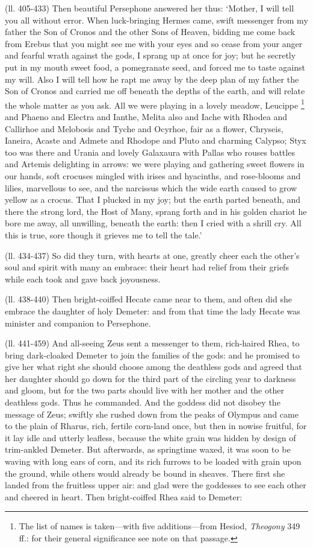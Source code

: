 (ll. 405-433) Then beautiful Persephone answered her thus: ‘Mother, I
will tell you all without error. When luck-bringing Hermes came, swift
messenger from my father the Son of Cronos and the other Sons of Heaven,
bidding me come back from Erebus that you might see me with your eyes and so
cease from your anger and fearful wrath against the gods, I sprang up at once
for joy; but he secretly put in my mouth sweet food, a pomegranate seed, and
forced me to taste against my will. Also I will tell how he rapt me away by the
deep plan of my father the Son of Cronos and carried me off beneath the depths
of the earth, and will relate the whole matter as you ask. All we were playing
in a lovely meadow, Leucippe \footnote{The list of names is
taken—with five additions—from Hesiod, \emph{Theogony} 349
ff.: for their general significance see note on that passage.} and Phaeno and Electra and
Ianthe, Melita also and Iache with Rhodea and Callirhoe and Melobosis and Tyche
and Ocyrhoe, fair as a flower, Chryseis, Ianeira, Acaste and Admete and Rhodope
and Pluto and charming Calypso; Styx too was there and Urania and lovely
Galaxaura with Pallas who rouses battles and Artemis delighting in arrows: we
were playing and gathering sweet flowers in our hands, soft crocuses mingled
with irises and hyacinths, and rose-blooms and lilies, marvellous to see, and
the narcissus which the wide earth caused to grow yellow as a crocus. That I
plucked in my joy; but the earth parted beneath, and there the strong lord, the
Host of Many, sprang forth and in his golden chariot he bore me away, all
unwilling, beneath the earth: then I cried with a shrill cry. All this is true,
sore though it grieves me to tell the tale.’

(ll. 434-437) So did they turn, with hearts at one, greatly cheer each the
other’s soul and spirit with many an embrace: their heart had relief from
their griefs while each took and gave back joyousness.

(ll. 438-440) Then bright-coiffed Hecate came near to them, and often did she
embrace the daughter of holy Demeter: and from that time the lady Hecate was
minister and companion to Persephone.

(ll. 441-459) And all-seeing Zeus sent a messenger to them, rich-haired Rhea,
to bring dark-cloaked Demeter to join the families of the gods: and he promised
to give her what right she should choose among the deathless gods and agreed
that her daughter should go down for the third part of the circling year to
darkness and gloom, but for the two parts should live with her mother and the
other deathless gods. Thus he commanded. And the goddess did not disobey the
message of Zeus; swiftly she rushed down from the peaks of Olympus and came to
the plain of Rharus, rich, fertile corn-land once, but then in nowise fruitful,
for it lay idle and utterly leafless, because the white grain was hidden by
design of trim-ankled Demeter. But afterwards, as springtime waxed, it was soon
to be waving with long ears of corn, and its rich furrows to be loaded with
grain upon the ground, while others would already be bound in sheaves. There
first she landed from the fruitless upper air: and glad were the goddesses to
see each other and cheered in heart. Then bright-coiffed Rhea said to Demeter:

